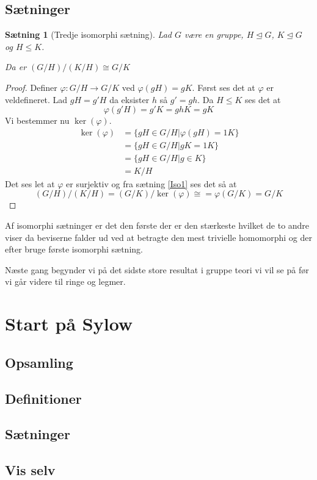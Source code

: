 \documentclass{article}
\newcommand{\too}{\rightarrow}
\newtheorem{setn}{Sætning}
\begin{document}
{		\subsection*{Sætninger}
		\begin{setn}[Tredje isomorphi sætning] \label{Iso3}
			Lad $G$ være en gruppe, $H \unlhd G$, $K \unlhd G$ og $H \le K$.

			Da er $(G/H)/(K/H) \cong G/K$
		\end{setn}
		\begin{proof}
			Definer $\varphi: G/H \too G/K$ ved $\varphi(gH) = gK$. Først ses
			det at $\varphi$ er veldefineret. Lad $gH = g'H$ da eksister $h$ så
			$g' = gh$. Da $H \le K$ ses det at
			$$\varphi(g'H) = g'K = ghK = gK$$
			Vi bestemmer nu $\ker(\varphi)$.
			\begin{align*}
				\ker(\varphi) &= \{gH \in G/H| \varphi(gH) = 1K\} \\
				&= \{gH \in G/H| gK = 1K\} \\
				&= \{gH \in G/H| g \in K\} \\
				&= K/H
			\end{align*}
			Det ses let at $\varphi$ er surjektiv og fra sætning \ref{Iso1} ses det så at
			$$(G/H)/(K/H) = (G/K)/\ker(\varphi) \cong = \varphi(G/K) = G/K$$
		\end{proof}
		Af isomorphi sætninger er det den første der er den stærkeste hvilket de to andre viser
		da beviserne falder ud ved at betragte den mest trivielle homomorphi og der efter bruge
		første isomorphi sætning.

		Næste gang begynder vi på det sidste store resultat i gruppe teori vi vil se på før vi
		går videre til ringe og legmer.
	\newpage
	\section*{Start på Sylow}
		\subsection*{Opsamling}
		\subsection*{Definitioner}
		\subsection*{Sætninger}
		\subsection*{Vis selv}
}
\end{document}
